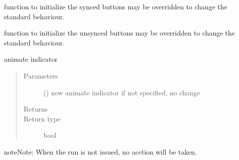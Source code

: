 \documentclass[letterpaper,10pt,english]{sphinxmanual}
\begin{document}
\begin{fulllineitems}
\begin{fulllineitems}
\end{fulllineitems}


\begin{fulllineitems}
\label{\detokenize{Reference:salabim.Environment.an_synced_buttons}}
function to initialize the synced buttons 
may be overridden to change the standard behaviour.

\end{fulllineitems}


\begin{fulllineitems}
\label{\detokenize{Reference:salabim.Environment.an_unsynced_buttons}}
function to initialize the unsynced buttons 
may be overridden to change the standard behaviour.

\end{fulllineitems}


\begin{fulllineitems}
\label{\detokenize{Reference:salabim.Environment.animate}}
animate indicator
\begin{quote}\begin{description}
\item[{Parameters}] \leavevmode
{} () \textendash{} new animate indicator 
if not specified, no change

\item[{Returns}] \leavevmode
{}

\item[{Return type}] \leavevmode
bool

\end{description}\end{quote}

\begin{sphinxadmonition}{note}{Note:}
When the run is not issued, no acction will be taken.
\end{sphinxadmonition}

\end{fulllineitems}


\end{fulllineitems}
\end{document}
